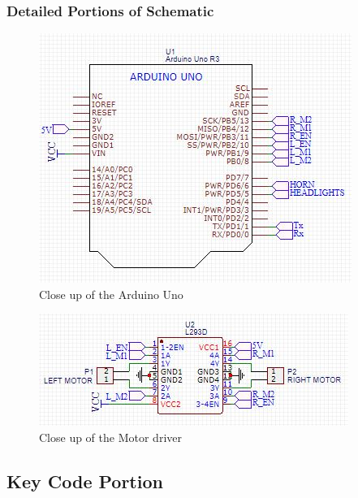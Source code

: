 \documentclass{article}
\begin{document}
	\subsubsection*{Detailed Portions of Schematic}
	
	\begin{figure}[H]
		\centering
		\includegraphics[scale=1.0]{uno}
		\caption{Close up of the Arduino Uno}
	\end{figure}
	
	\begin{figure}[H]
		\centering
		\includegraphics[scale=1.0]{l293d}
		\caption{Close up of the Motor driver}
	\end{figure}
	
	\subsection*{Key Code Portion}
\end{document}
